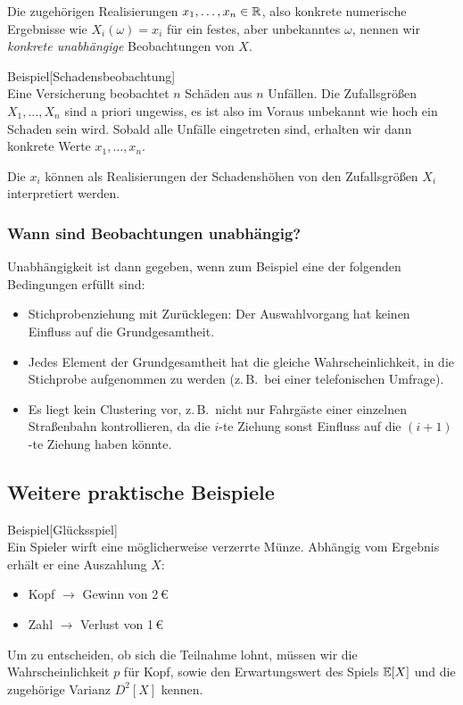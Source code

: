 Die zugehörigen Realisierungen $x_1, \dots, x_n \in \mathbb R$, also konkrete numerische Ergebnisse wie $X_i(\omega) = x_i$ 
für ein festes, aber unbekanntes $\omega$, nennen wir \emph{konkrete unabhängige} Beobachtungen von $X$.

\begin{colbox}{Beispiel}[Schadensbeobachtung]\ \\
Eine Versicherung beobachtet $n$ Schäden aus $n$ Unfällen. Die Zufallsgrößen $X_1, \dots, X_n$ sind 
a priori ungewiss, es ist also im Voraus unbekannt wie hoch ein Schaden sein wird. 
Sobald alle Unfälle eingetreten sind, erhalten wir dann konkrete Werte $x_1, \dots, x_n$.

Die $x_i$ können als Realisierungen der Schadenshöhen von den Zufallsgrößen $X_i$ interpretiert werden.
\end{colbox}

\subsubsection*{Wann sind Beobachtungen unabhängig?}

Unabhängigkeit ist dann gegeben, wenn zum Beispiel eine der folgenden Bedingungen erfüllt sind:
\begin{itemize}
    \item Stichprobenziehung mit Zurücklegen: Der Auswahlvorgang hat keinen Einfluss auf die Grundgesamtheit.
    \item Jedes Element der Grundgesamtheit hat die gleiche Wahrscheinlichkeit, 
        in die Stichprobe aufgenommen zu werden (z.\,B.\ bei einer telefonischen Umfrage).
    \item Es liegt kein Clustering vor, z.\,B.\ nicht nur Fahrgäste einer einzelnen Straßenbahn kontrollieren, 
        da die $i$-te Ziehung sonst Einfluss auf die $(i+1)$-te Ziehung haben könnte.
\end{itemize}

\subsection*{Weitere praktische Beispiele}

\begin{colbox}{Beispiel}[Glücksspiel]\ \\
Ein Spieler wirft eine möglicherweise verzerrte Münze. Abhängig vom Ergebnis erhält er eine Auszahlung $X$:
\begin{itemize}
    \item \glqq{}Kopf\grqq{} $\rightarrow$ Gewinn von 2\,€
    \item \glqq{}Zahl\grqq{} $\rightarrow$ Verlust von 1\,€
\end{itemize}
Um zu entscheiden, ob sich die Teilnahme lohnt, müssen wir die Wahrscheinlichkeit $p$ für \glqq{}Kopf\grqq{}, 
sowie den Erwartungswert des Spiels $\mathbb E[X]$ und die zugehörige Varianz $D^2[X]$ kennen.
\end{colbox}

